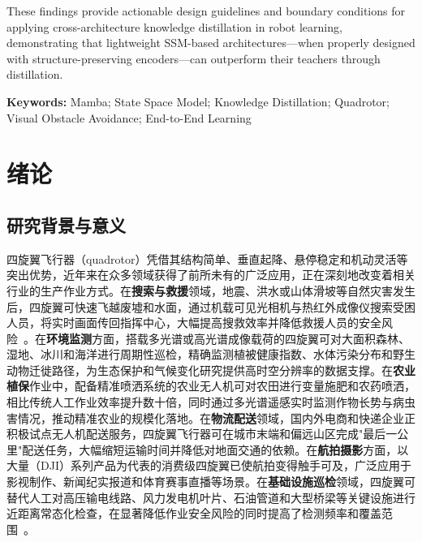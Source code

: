 \documentclass[12pt,a4paper]{article}
\makeatletter
\numberwithin{equation}{section}
\numberwithin{figure}{section}
\numberwithin{table}{section}
\newcommand{\cleardoublepage}{\clearpage\if@twoside\ifodd\c@page\else\hbox{}\thispagestyle{empty}\newpage\if@twocolumn\hbox{}\newpage\fi\fi\fi}%
\makeatother
\begin{document}
These findings provide actionable design guidelines and boundary conditions for applying cross-architecture knowledge distillation in robot learning, demonstrating that lightweight SSM-based architectures---when properly designed with structure-preserving encoders---can outperform their teachers through distillation.

\vspace{0.5cm}
\textbf{Keywords:} Mamba; State Space Model; Knowledge Distillation; Quadrotor; Visual Obstacle Avoidance; End-to-End Learning

\clearpage

\tableofcontents
\newpage
\listoffigures
\newpage
\listoftables
\newpage
{}
\setcounter{page}{1}

\cleardoublepage
\section{绪论}

\subsection{研究背景与意义}

\quad 四旋翼飞行器（quadrotor）凭借其结构简单、垂直起降、悬停稳定和机动灵活等突出优势，近年来在众多领域获得了前所未有的广泛应用，正在深刻地改变着相关行业的生产作业方式。在\textbf{搜索与救援}领域，地震、洪水或山体滑坡等自然灾害发生后，四旋翼可快速飞越废墟和水面，通过机载可见光相机与热红外成像仪搜索受困人员，将实时画面传回指挥中心，大幅提高搜救效率并降低救援人员的安全风险~\cite{kumar2012robotics}。在\textbf{环境监测}方面，搭载多光谱或高光谱成像载荷的四旋翼可对大面积森林、湿地、冰川和海洋进行周期性巡检，精确监测植被健康指数、水体污染分布和野生动物迁徙路径，为生态保护和气候变化研究提供高时空分辨率的数据支撑。在\textbf{农业植保}作业中，配备精准喷洒系统的农业无人机可对农田进行变量施肥和农药喷洒，相比传统人工作业效率提升数十倍，同时通过多光谱遥感实时监测作物长势与病虫害情况，推动精准农业的规模化落地。在\textbf{物流配送}领域，国内外电商和快递企业正积极试点无人机配送服务，四旋翼飞行器可在城市末端和偏远山区完成"最后一公里"配送任务，大幅缩短运输时间并降低对地面交通的依赖。在\textbf{航拍摄影}方面，以大量（DJI）系列产品为代表的消费级四旋翼已使航拍变得触手可及，广泛应用于影视制作、新闻纪实报道和体育赛事直播等场景。在\textbf{基础设施巡检}领域，四旋翼可替代人工对高压输电线路、风力发电机叶片、石油管道和大型桥梁等关键设施进行近距离常态化检查，在显著降低作业安全风险的同时提高了检测频率和覆盖范围~\cite{floreano2015flying}。
\end{document}
